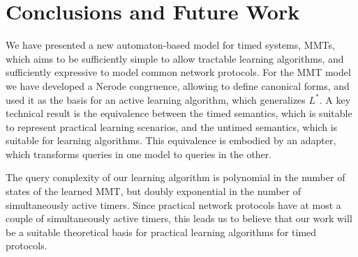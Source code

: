 
\section{Conclusions and Future Work}
\label{conclusions}

We have presented a new automaton-based model for timed systems, MMTs,
which aims to
be sufficiently simple to allow tractable learning algorithms, and sufficiently
expressive to model common network protocols. For the MMT model we have
developed a Nerode congruence, allowing to define canonical forms, and used it
as the basis for an active learning algorithm, which generalizes $L^*$.
A key technical result is the equivalence between the timed semantics,
which is suitable to represent practical learning scenarios, and the
untimed semantics, which is suitable for learning
algorithms.
\iflong
This equivalence is embodied by an adapter, which transforms queries in one model to queries in the other.
\fi

The query complexity of our learning algorithm is polynomial in the number of
states of the learned MMT, but doubly exponential in the number of simultaneously
active timers. Since practical network protocols have at most a couple of
simultaneously active timers, this leads us to believe that our work will
be a suitable theoretical basis for practical learning algorithms for timed
protocols.

